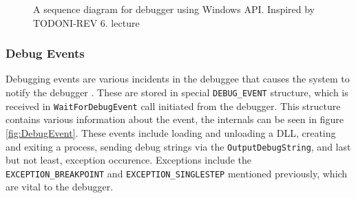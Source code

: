 \begin{figure}
    \centering
    \caption{A sequence diagram for debugger using Windows API. Inspired by TODO{NI-REV 6. lecture}}
    \label{fig:win32debugger}
\end{figure}
 
\subsubsection*{Debug Events}\label{section:Debug Events}
Debugging events are various incidents in the debuggee that causes the system
to notify the debugger \cite{windows-msdn-debug-events}. These are stored in
special \texttt{DEBUG_EVENT} structure, which is received in
\texttt{WaitForDebugEvent} call initiated from the debugger. This structure
contains various information about the event, the internals can be seen in
figure \ref{fig:DebugEvent}. These events include loading and unloading a DLL,
creating and exiting a process, sending debug strings via the
\texttt{OutputDebugString}, and last but not least, exception occurence.
Exceptions include the \texttt{EXCEPTION\_BREAKPOINT} and
\texttt{EXCEPTION\_SINGLESTEP} mentioned previously, which are vital to the
debugger.

